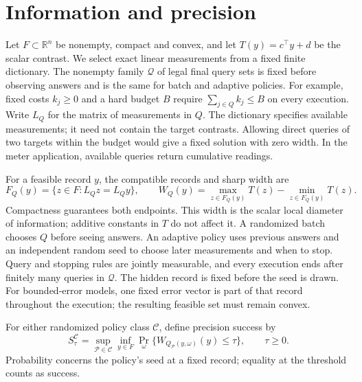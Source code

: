 \section{Information and precision}
\label{sec:risk_setup}
Let $F\subset\mathbb R^n$ be nonempty, compact and convex, and let
$T(y)=c^\top y+d$ be the scalar contrast. We select exact linear
measurements from a fixed finite dictionary. The nonempty family
$\mathcal Q$ of legal final query sets is fixed before observing answers
and is the same for batch and adaptive policies. For example, fixed costs
$k_j\geq0$ and a hard budget $B$ require $\sum_{j\in Q}k_j\leq B$ on
every execution. Write $L_Q$ for the matrix of measurements in $Q$.
The dictionary specifies available measurements; it need not contain the
target contrasts. Allowing direct queries of two targets within the budget
would give a fixed solution with zero width. In the meter application,
available queries return cumulative readings.

For a feasible record $y$, the compatible records and sharp width are
\begin{equation}
 F_Q(y)=\{z\in F:L_Qz=L_Qy\},\qquad
 W_Q(y)=\max_{z\in F_Q(y)}T(z)-\min_{z\in F_Q(y)}T(z).
 \label{eq:risk_fiber}
\end{equation}
Compactness guarantees both endpoints. This width is the scalar local
diameter of information; additive constants in $T$ do not affect it.
A randomized batch chooses $Q$ before seeing answers. An adaptive policy
uses previous answers and an independent random seed to choose later
measurements and when to stop. Query and stopping rules are jointly
measurable, and every execution ends after finitely many queries in
$\mathcal Q$. The hidden record is fixed before the seed is drawn.
For bounded-error models, one fixed error vector is part of that record
throughout the execution; the resulting feasible set must remain convex.

For either randomized policy class $\mathcal C$, define precision success by
\begin{equation}
 S_\tau^{\mathcal C}
 =\sup_{\mathcal P\in\mathcal C}\inf_{y\in F}
   \Pr_\omega\{W_{Q_{\mathcal P}(y,\omega)}(y)\leq\tau\},
 \qquad \tau\geq0.
 \label{eq:risk_precision_success}
\end{equation}
Probability concerns the policy's seed at a fixed record; equality at the
threshold counts as success.

